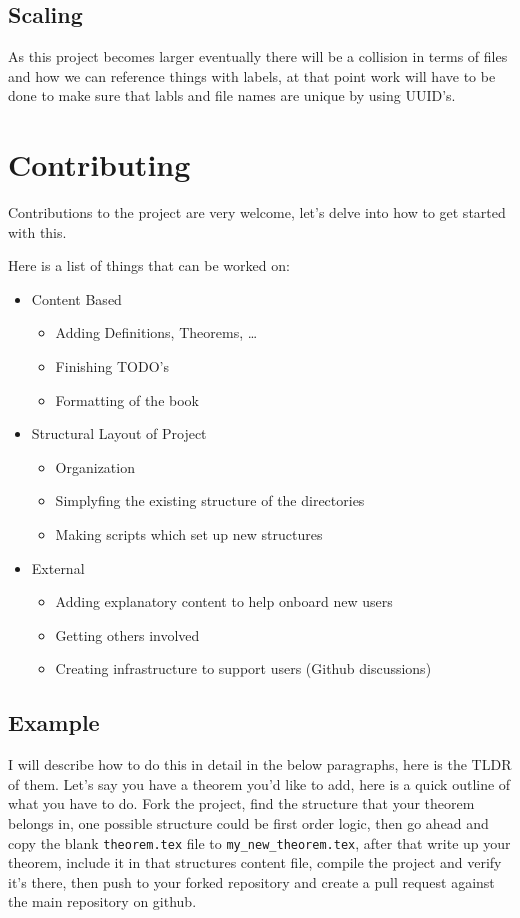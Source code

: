 \section*{Scaling}
As this project becomes larger eventually there will be a collision in terms of
files and how we can reference things with labels, at that point work will have
to be done to make sure that labls and file names are unique by using UUID's.


\chapter*{Contributing}
 
Contributions to the project are very welcome, let's delve into how to get
started with this.

Here is a list of things that can be worked on:

\begin{itemize}
  \item Content Based 
  \begin{itemize}
      \item Adding Definitions, Theorems, \ldots
      \item Finishing TODO's
      \item Formatting of the book
  \end{itemize}
  \item Structural Layout of Project 
  \begin{itemize}
      \item Organization
      \item Simplyfing the existing structure of the directories 
      \item Making scripts which set up new structures
  \end{itemize}
  \item External
  \begin{itemize}
      \item Adding explanatory content to help onboard new users
      \item Getting others involved
      \item Creating infrastructure to support users (Github discussions)
  \end{itemize}
\end{itemize}

\section*{Example}
I will describe how to do this in detail in the below paragraphs, here is the
TLDR of them. Let's say you have a theorem you'd like to add, here is a quick
outline of what you have to do. Fork the project,  find the structure that your
theorem belongs in, one possible structure could be first order logic, then go
ahead and copy the blank \texttt{theorem.tex} file to
\texttt{my\_new\_theorem.tex}, after that write up your theorem, include it in
that structures content file, compile the project and verify it's there, then
push to your forked repository and create a pull request against the main
repository on github.

